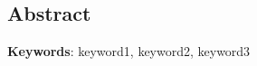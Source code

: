 %
\noindent \begin{center}
\section*{Abstract}
\par\end{center}

\lipsum[1-2]

\vspace{0.5cm}
\begin{flushleft}
\textbf{Keywords}: keyword1, keyword2, keyword3
\end{flushleft}
%
